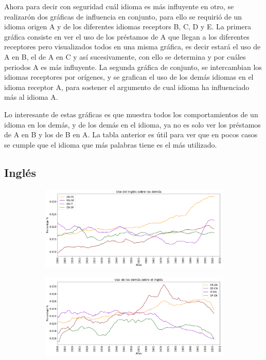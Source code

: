 Ahora para decir con seguridad cuál idioma es más influyente en otro,  se realizarón dos gráficas de influencia en conjunto, para ello se requirió de un idioma origen A y de los diferentes idiomas receptors B, C, D y E.  La primera gráfica consiste en ver  el uso de los préstamos de A que llegan a los diferentes receptores pero visualizados todos en una misma gráfica,  es decir estará el uso de A en B, el de A en C y así sucesivamente,  con ello se determina y por cuáles periodos  A es más influyente.   La segunda gráfica de conjunto, se intercambian los idiomas receptores por orígenes, y se grafican el uso de los demás idiomas en el idioma receptor A, para  sostener el argumento de cual idioma ha influenciado más al idioma A.       

Lo interesante de estas gráficas es que  muestra todos los comportamientos de un idioma en los demás, y de los demás en el idioma,  ya no es solo ver los préstamos de A en B y los de B en A. La tabla anterior es útil para ver que en pocos casos se cumple que el idioma que más palabras tiene es el más utilizado. 

\newpage
\subsection{Inglés}


\begin{figure}[h!]
	
	\begin{subfigure}{}
		\centering
		\includegraphics[scale=.38]{Cap_4/PF1_S2_EN.png}
		\caption{}
		\label{fig:ST_EN_a}
	\end{subfigure}
	
	\begin{subfigure}{}
		\centering
		\includegraphics[scale=.38]{Cap_4/PF2_S2_EN.png}
		\caption{}
		\label{fig:ST_EN_b}
	\end{subfigure}
	
\end{figure}


